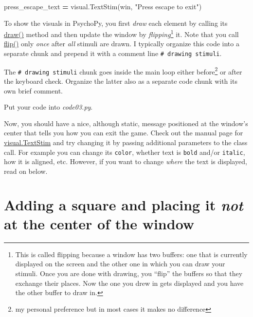 \documentclass[
]{book}
\newenvironment{Shaded}{\begin{snugshade}}{\end{snugshade}}
\newcommand{\NormalTok}[1]{#1}
\newcommand{\OperatorTok}[1]{\textcolor[rgb]{0.81,0.36,0.00}{\textbf{#1}}}
\newcommand{\StringTok}[1]{\textcolor[rgb]{0.31,0.60,0.02}{#1}}
\begin{document}
\begin{Shaded}
\begin{Highlighting}[]
\NormalTok{press\_escape\_text }\OperatorTok{=}\NormalTok{ visual.TextStim(win, }\StringTok{"Press escape to exit"}\NormalTok{)}
\end{Highlighting}
\end{Shaded}

To show the visuals in PsychoPy, you first \emph{draw} each element by calling its \href{https://psychopy.org/api/visual/textstim.html\#psychopy.visual.TextStim.draw}{draw()} method and then update the window by \emph{flipping}\footnote{This is called flipping because a window has two buffers: one that is currently displayed on the screen and the other one in which you can draw your stimuli. Once you are done with drawing, you ``flip'' the buffers so that they exchange their places. Now the one you drew in gets displayed and you have the other buffer to draw in.} it. Note that you call \href{https://psychopy.org/api/visual/window.html\#psychopy.visual.Window.flip}{flip()} only \emph{once} after \emph{all} stimuli are drawn. I typically organize this code into a separate chunk and prepend it with a comment line \texttt{\#\ drawing\ stimuli}.

The \texttt{\#\ drawing\ stimuli} chunk goes inside the main loop either before\footnote{my personal preference but in most cases it makes no difference} or after the keyboard check. Organize the latter also as a separate code chunk with its own brief comment.

Put your code into \emph{code03.py}.

Now, you should have a nice, although static, message positioned at the window's center that tells you how you can exit the game. Check out the manual page for \href{https://psychopy.org/api/visual/textstim.html}{visual.TextStim} and try changing it by passing additional parameters to the class call. For example you can change its \texttt{color}, whether text is \texttt{bold} and/or \texttt{italic}, how it is aligned, etc. However, if you want to change \emph{where} the text is displayed, read on below.

\hypertarget{adding-a-square-and-placing-it-not-at-the-center-of-the-window}{%
\section{\texorpdfstring{Adding a square and placing it \emph{not} at the center of the window}{Adding a square and placing it not at the center of the window}}\label{adding-a-square-and-placing-it-not-at-the-center-of-the-window}}
\end{document}

